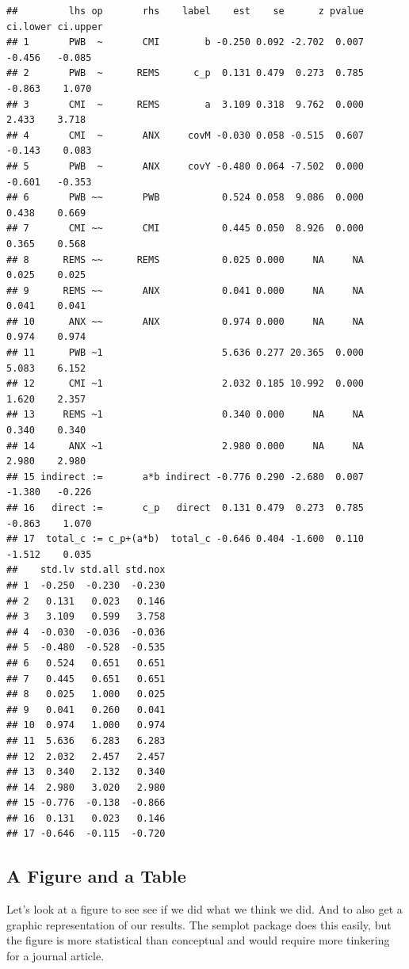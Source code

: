 \documentclass[
  11pt,
]{book}
\begin{document}
\begin{verbatim}
##         lhs op       rhs    label    est    se      z pvalue ci.lower ci.upper
## 1       PWB  ~       CMI        b -0.250 0.092 -2.702  0.007   -0.456   -0.085
## 2       PWB  ~      REMS      c_p  0.131 0.479  0.273  0.785   -0.863    1.070
## 3       CMI  ~      REMS        a  3.109 0.318  9.762  0.000    2.433    3.718
## 4       CMI  ~       ANX     covM -0.030 0.058 -0.515  0.607   -0.143    0.083
## 5       PWB  ~       ANX     covY -0.480 0.064 -7.502  0.000   -0.601   -0.353
## 6       PWB ~~       PWB           0.524 0.058  9.086  0.000    0.438    0.669
## 7       CMI ~~       CMI           0.445 0.050  8.926  0.000    0.365    0.568
## 8      REMS ~~      REMS           0.025 0.000     NA     NA    0.025    0.025
## 9      REMS ~~       ANX           0.041 0.000     NA     NA    0.041    0.041
## 10      ANX ~~       ANX           0.974 0.000     NA     NA    0.974    0.974
## 11      PWB ~1                     5.636 0.277 20.365  0.000    5.083    6.152
## 12      CMI ~1                     2.032 0.185 10.992  0.000    1.620    2.357
## 13     REMS ~1                     0.340 0.000     NA     NA    0.340    0.340
## 14      ANX ~1                     2.980 0.000     NA     NA    2.980    2.980
## 15 indirect :=       a*b indirect -0.776 0.290 -2.680  0.007   -1.380   -0.226
## 16   direct :=       c_p   direct  0.131 0.479  0.273  0.785   -0.863    1.070
## 17  total_c := c_p+(a*b)  total_c -0.646 0.404 -1.600  0.110   -1.512    0.035
##    std.lv std.all std.nox
## 1  -0.250  -0.230  -0.230
## 2   0.131   0.023   0.146
## 3   3.109   0.599   3.758
## 4  -0.030  -0.036  -0.036
## 5  -0.480  -0.528  -0.535
## 6   0.524   0.651   0.651
## 7   0.445   0.651   0.651
## 8   0.025   1.000   0.025
## 9   0.041   0.260   0.041
## 10  0.974   1.000   0.974
## 11  5.636   6.283   6.283
## 12  2.032   2.457   2.457
## 13  0.340   2.132   0.340
## 14  2.980   3.020   2.980
## 15 -0.776  -0.138  -0.866
## 16  0.131   0.023   0.146
## 17 -0.646  -0.115  -0.720
\end{verbatim}

\hypertarget{a-figure-and-a-table-1}{%
\subsection{A Figure and a Table}\label{a-figure-and-a-table-1}}

Let's look at a figure to see see if we did what we think we did. And to also get a graphic representation of our results. The semplot package does this easily, but the figure is more statistical than conceptual and would require more tinkering for a journal article.
\end{document}

